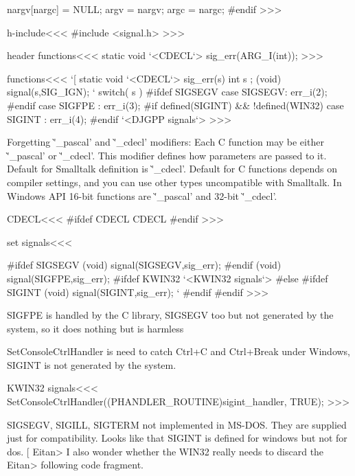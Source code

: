 {{{{{{{{    nargv[nargc] = NULL;
    argv = nargv;
    argc = nargc;
  }
#endif
>>>




\<h-include\><<<
#include <signal.h>
>>>

\<header functions\><<<
static void 
`<CDECL`>
sig_err(ARG_I(int));
>>>




\<functions\><<<
`[
static void
`<CDECL`>
sig_err(s)  int s
;{
  (void) signal(s,SIG_IGN);  `%
  switch( s ){
#ifdef SIGSEGV
    case SIGSEGV: err_i(2); 
#endif
    case SIGFPE : err_i(3);  
#if defined(SIGINT) && !defined(WIN32)
    case SIGINT : err_i(4);
#endif
  } 
  `<DJGPP signals`>
}
>>>




Forgetting \`'_pascal' and \`'_cdecl' modifiers: Each C function may
be either \`'_pascal' or \`'_cdecl'. This modifier defines how
parameters are passed to it. Default for Smalltalk definition is
\`'_cdecl'. Default for C functions depends on compiler settings, and
you can use other types uncompatible with Smalltalk. In Windows API
16-bit functions are \`'_pascal' and 32-bit \`'_cdecl'.
 


\<CDECL\><<< 
#ifdef CDECL
CDECL
#endif
>>>
 



\<set signals\><<<

#ifdef SIGSEGV
  (void) signal(SIGSEGV,sig_err);
#endif
  (void) signal(SIGFPE,sig_err);
#ifdef KWIN32
  `<KWIN32 signals`>
#else 
#ifdef SIGINT
  (void) signal(SIGINT,sig_err);    `%
#endif
#endif
>>>



SIGFPE is handled by the C library, SIGSEGV too but not generated by
the system, so it does nothing but is harmless 

SetConsoleCtrlHandler is need to catch Ctrl+C and Ctrl+Break under
Windows, SIGINT is not generated by the system.
 
\<KWIN32 signals\><<<
SetConsoleCtrlHandler((PHANDLER_ROUTINE)sigint_handler, TRUE);
>>>



SIGSEGV, SIGILL, SIGTERM not implemented in MS-DOS. They are supplied just for
compatibility. Looks like that SIGINT is defined for windows but not for dos.
\ifHtml[\Verbatim
    Eitan> I also wonder whether the WIN32 really needs to discard the
    Eitan> following code fragment.

}}}}}}}
